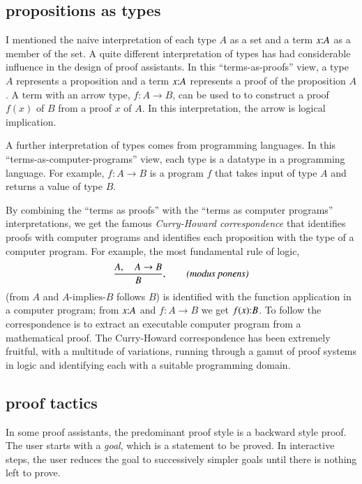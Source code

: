 \documentclass{llncs}
\def\tc{\hbox{:}}
\begin{document}
\subsection{propositions as types}

I mentioned the naive interpretation of each type $A$ as a set and a
term $x\tc A$ as a member of the set.  A quite different
interpretation of types has had considerable influence in the design
of proof assistants.  In this ``terms-as-proofs'' view, a type $A$
represents a proposition and a term $x\tc A$ represents a proof of the
proposition $A$.  A term with an arrow type, $f:A\rightarrow B$, can
be used to to construct a proof $f(x)$ of $B$ from a proof $x$ of $A$.
In this interpretation, the arrow is logical implication.

A further interpretation of types comes from programming languages.
In this ``terms-as-computer-programs'' view, each type is a datatype
in a programming language.  For example,
$f:A\rightarrow B$ is a program $f$ that takes input of type
$A$ and returns a value of type $B$.

By combining the ``terms as proofs'' with the ``terms as computer
programs'' interpretations, we get the famous {\it Curry-Howard
  correspondence} that identifies proofs with computer programs and
identifies each proposition with the type of a computer program. 
For example,  the most fundamental rule of logic,
\[
\frac{A,\quad A\rightarrow B}{B},  \qquad \text{\it(modus ponens)}
\]
(from $A$ and $A\text{-implies-}B$ follows $B$) is identified with the
function application in a computer program; from $x\tc A$ and
$f:A\rightarrow B$ we get $f(x)\tc B$.  To follow the correspondence
is to extract an executable computer program from a mathematical
proof.  The Curry-Howard correspondence has been extremely fruitful,
with a multitude of variations, running through a gamut of proof
systems in logic and identifying each with a suitable programming
domain.






\subsection{proof tactics}

In some proof assistants, the predominant proof style is a backward
style proof.  The user starts with a {\it goal}, which is a statement
to be proved. In interactive steps, the user reduces the goal to
successively simpler goals until there is nothing left to prove.
\end{document}
